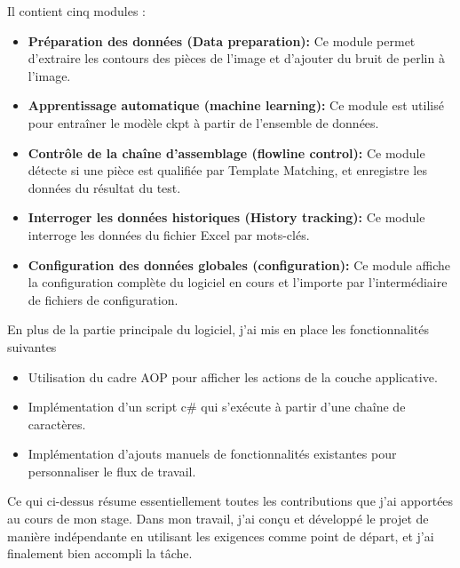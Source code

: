 Il contient cinq modules : 
\begin{itemize}
    \item \textbf{Préparation des données (Data preparation): }Ce module permet d'extraire les contours des pièces de l'image et d'ajouter du bruit de perlin à l'image. 
    \item \textbf{Apprentissage automatique (machine learning): }Ce module est utilisé pour entraîner le modèle ckpt à partir de l'ensemble de données.
    \item \textbf{Contrôle de la chaîne d'assemblage (flowline control): } Ce module détecte si une pièce est qualifiée par Template Matching, et enregistre les données du résultat du test.
    \item \textbf{Interroger les données historiques  (History tracking): }Ce module interroge les données du fichier Excel par mots-clés.
    \item \textbf{Configuration des données globales (configuration): }Ce module affiche la configuration complète du logiciel en cours et l'importe par l'intermédiaire de fichiers de configuration.
\end{itemize}

En plus de la partie principale du logiciel, j'ai mis en place les fonctionnalités suivantes
\begin{itemize}
    \item Utilisation du cadre AOP pour afficher les actions de la couche applicative.
    \item Implémentation d'un script c\# qui s'exécute à partir d'une chaîne de caractères.
    \item Implémentation d'ajouts manuels de fonctionnalités existantes pour personnaliser le flux de travail.
\end{itemize}

Ce qui ci-dessus résume essentiellement toutes les contributions que j'ai apportées au cours de mon stage. Dans mon travail, j'ai conçu et développé le projet de manière indépendante en utilisant les exigences comme point de départ, et j'ai finalement bien accompli la tâche. 

\newpage
